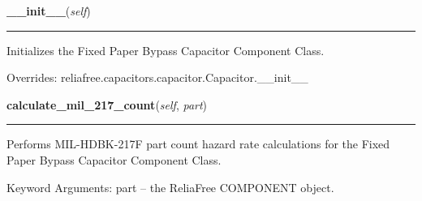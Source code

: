 \hspace{.8\funcindent}\begin{boxedminipage}{\funcwidth}

    \raggedright \textbf{\_\_init\_\_}(\textit{self})

    \vspace{-1.5ex}

    \rule{\textwidth}{0.5\fboxrule}
\setlength{\parskip}{2ex}
    Initializes the Fixed Paper Bypass Capacitor Component Class.

\setlength{\parskip}{1ex}
      Overrides: reliafree.capacitors.capacitor.Capacitor.\_\_init\_\_

    \end{boxedminipage}

    \label{reliafree:capacitors:fixed:PaperBypass:calculate_mil_217_count}

    \vspace{0.5ex}

\hspace{.8\funcindent}\begin{boxedminipage}{\funcwidth}

    \raggedright \textbf{calculate\_mil\_217\_count}(\textit{self}, \textit{part})

    \vspace{-1.5ex}

    \rule{\textwidth}{0.5\fboxrule}
\setlength{\parskip}{2ex}
    Performs MIL-HDBK-217F part count hazard rate calculations for the 
    Fixed Paper Bypass Capacitor Component Class.

    Keyword Arguments: part -- the ReliaFree COMPONENT object.

\setlength{\parskip}{1ex}
    \end{boxedminipage}

    \label{reliafree:capacitors:fixed:PaperBypass:calculate_mil_217_stress}

    \vspace{0.5ex}

